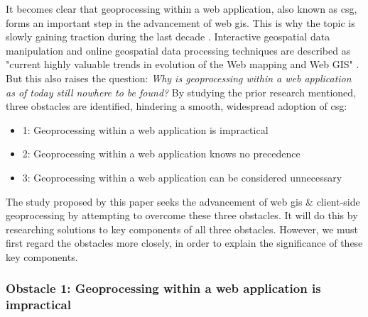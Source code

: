 It becomes clear that \ac{geoprocessing} within a web application, also known as \ac{csg}, forms an important step in the advancement of web \ac{gis}. This is why the topic is slowly gaining traction during the last decade \cite{kulawiak_analysis_2019, panidi_hybrid_2015, hamilton_client-side_2014}. Interactive geospatial data manipulation and online geospatial data processing techniques are described as "current highly valuable trends in evolution of the Web mapping and Web GIS" \cite{panidi_hybrid_2015}. But this also raises the question: \textit{Why is geoprocessing within a web application as of today still nowhere to be found?} By studying the prior research mentioned, three obstacles are identified, hindering a smooth, widespread adoption of \ac{csg}: 
\begin{itemize}
  \item 1: Geoprocessing within a web application is impractical
  \item 2: Geoprocessing within a web application knows no precedence
  \item 3: Geoprocessing within a web application can be considered unnecessary 
\end{itemize}

The study proposed by this paper seeks the advancement of web \ac{gis} \& client-side geoprocessing by attempting to overcome these three obstacles. It will do this by researching solutions to key components of all three obstacles. However, we must first regard the obstacles more closely, in order to explain the significance of these key components. 

\newpage
\subsubsection*{Obstacle 1: Geoprocessing within a web application is impractical}

